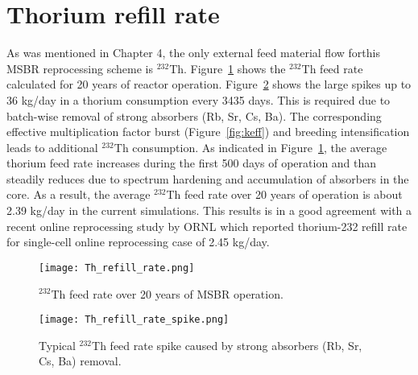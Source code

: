 \section{Thorium refill rate}
As was mentioned in Chapter 4, the only external feed material flow forthis \gls{MSBR} reprocessing scheme is $^{232}$Th. Figure~\ref{fig:th_refill} shows the $^{232}$Th feed rate calculated for 20 years of reactor operation. Figure~\ref{fig:th_refill_spike} shows the large spikes up to 36 kg/day in a thorium consumption every 3435 days. This is required due to batch-wise removal of strong absorbers (Rb, Sr, Cs, Ba). The corresponding effective multiplication factor burst (Figure~\ref{fig:keff}) and breeding intensification leads to additional $^{232}$Th consumption. As indicated in Figure~\ref{fig:th_refill}, the average thorium feed rate increases during the first 500 days of operation and than steadily reduces due to spectrum hardening and accumulation of absorbers in the core. As a result, the average $^{232}$Th feed rate over 20 years of operation is about 2.39 kg/day in the current simulations. This results is in a good agreement with a recent online reprocessing study by \gls{ORNL} \cite{betzler_molten_2017} which reported thorium-232 refill rate for single-cell online reprocessing case of 2.45 kg/day.

\begin{figure}[htp!] %
  \centering
    \vspace{-0.3em}
  \texttt{[image: Th\_refill\_rate.png]} 
      \vspace{-1.5em}
  \caption{$^{232}$Th feed rate over 20 years of \gls{MSBR} operation.}
    \vspace{-0.6em}
  \label{fig:th_refill}
\end{figure}
\begin{figure}[htp!] %
  \centering
    \vspace{-0.3em}
  \texttt{[image: Th\_refill\_rate\_spike.png]} 
      \vspace{-1.5em}
  \caption{Typical $^{232}$Th feed rate spike caused by strong absorbers (Rb, Sr, Cs, Ba) removal.}
    \vspace{-0.6em}
  \label{fig:th_refill_spike}
\end{figure}
\FloatBarrier
